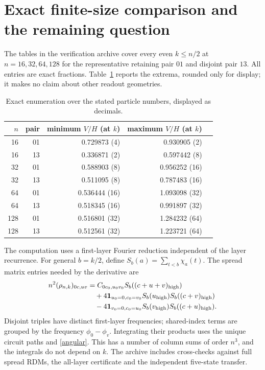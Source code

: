 \documentclass[11pt]{article}
\begin{document}
\section{Exact finite-size comparison and the remaining question}
The tables in the verification archive cover every even $k\leq n/2$ at
$n=16,32,64,128$ for the representative retaining pair $01$ and disjoint pair $13$.
All entries are exact fractions. Table~\ref{numerics} reports the extrema,
rounded only for display; it makes no claim about other readout geometries.
\begin{table}[ht]
\centering
\begin{tabular}{rrrrr}
\toprule
$n$ & pair & minimum $V/H$ (at $k$) & maximum $V/H$ (at $k$)\\
\midrule
16 &01&0.729873 (4)&0.930905 (2)\\
16 &13&0.336871 (2)&0.597442 (8)\\
32 &01&0.588903 (8)&0.956252 (16)\\
32 &13&0.511095 (8)&0.787483 (16)\\
64 &01&0.536444 (16)&1.093098 (32)\\
64 &13&0.518345 (16)&0.991897 (32)\\
128 &01&0.516801 (32)&1.284232 (64)\\
128 &13&0.512561 (32)&1.223721 (64)\\
\bottomrule
\end{tabular}
\caption{Exact enumeration over the stated particle numbers, displayed as decimals.}
\label{numerics}
\end{table}

The computation uses a first-layer Fourier reduction independent of the
layer recurrence. For general $b=k/2$, define
$S_b(a)=\sum_{t<b}\chi_a(t)$. The spread matrix entries needed by the derivative are
\begin{align*}
 n^2(\rho_{n,k})_{0c,uv}
 &=C_{0c_0,u_0v_0}S_b((c+u+v)_{\rm high})\\
 &\quad+4\mathbf1_{u_0=0,c_0=v_0}S_b(u_{\rm high})S_b((c+v)_{\rm high})\\
 &\quad-4\mathbf1_{v_0=0,c_0=u_0}S_b(v_{\rm high})S_b((c+u)_{\rm high}).
\end{align*}
Disjoint triples have distinct first-layer frequencies; shared-index terms
are grouped by the frequency $\phi_0-\phi_v$. Integrating their products uses
the unique circuit paths and \eqref{angular}. This has a number of column sums
of order $n^3$, and the integrals do not depend on $k$. The archive includes
cross-checks against full spread RDMs, the all-layer certificate and the
independent five-state transfer.
\end{document}
